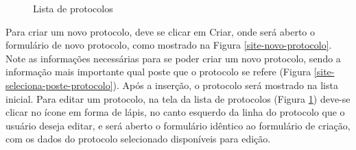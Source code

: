 \documentclass[
	article,			%
	11pt,				%
	oneside,			%
	a4paper,			%
	english,			%
	brazil,				%
	sumario=tradicional
	]{abntex2}
\begin{document}
\begin{figure}[!htbp]
 \centering
 \caption{\label{site-tela-inicial}Lista de protocolos}
\end{figure}

Para criar um novo protocolo, deve se clicar em Criar, onde será aberto o formulário de novo protocolo, como mostrado na Figura \ref{site-novo-protocolo}.
Note as informações necessárias para se poder criar um novo protocolo, sendo a informação mais importante qual poste que o protocolo se refere (Figura \ref{site-seleciona-poste-protocolo}).
Após a inserção, o protocolo será mostrado na lista inicial.
Para editar um protocolo, na tela da lista de protocolos (Figura \ref{site-tela-inicial}) deve-se clicar no ícone em forma de lápis, no canto esquerdo da linha do protocolo que o usuário deseja editar, e será aberto o formulário idêntico ao formulário de criação, com os dados do protocolo selecionado disponíveis para edição.
\end{document}
